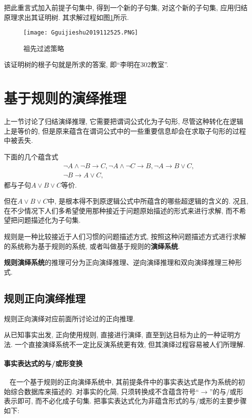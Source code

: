 把此重言式加入前提子句集中, 得到一个新的子句集, 对这个新的子句集, 应用归结原理求出其证明树. 其求解过程如图\ref{AI32fig25}所示.
\begin{figure}[H]
\centering
\texttt{[image: Gguijieshu2019112525.PNG]}
\caption{祖先过滤策略}
\label{AI32fig25}
\end{figure}
该证明树的根子句就是所求的答案, 即“李明在302教室”.
\section{基于规则的演绎推理}
上一节讨论了归结演绎推理, 它需要把谓词公式化为子句形, 尽管这种转化在逻辑上是等价的, 但是原来蕴含在谓词公式中的一些重要信息却会在求取子句形的过程中被丢失.
\begin{example}
下面的几个蕴含式
\begin{align}
  &\neg A\wedge \neg B\rightarrow C,  \neg A\wedge \neg C\rightarrow B,  \neg A\rightarrow B\vee C,\\
  &\neg B\rightarrow A\vee C,
\end{align}
都与子句$A\vee B\vee C$等价.
\end{example}

但在$A\vee B\vee C$中, 是根本得不到原逻辑公式中所蕴含的哪些超逻辑的含义的. 况且, 在不少情况下人们多希望使用那种接近于问题原始描述的形式来进行求解, 而不希望把问题描述化为子句集.

规则是一种比较接近于人们习惯的问题描述方式, 按照这种问题描述方式进行求解的系统称为基于规则的系统, 或者叫做基于规则的\textbf{演绎系统}.

\textbf{规则演绎系统}的推理可分为正向演绎推理、逆向演绎推理和双向演绎推理三种形式.
\subsection{规则正向演绎推理}
规则正向演绎对应前面所讨论过的正向推理.

从已知事实出发, 正向使用规则, 直接进行演绎, 直至到达目标为止的一种证明方法. 一个直接演绎系统不一定比反演系统更有效, 但其演绎过程容易被人们所理解.
\paragraph{事实表达式的与/或形变换}~{}
在一个基于规则的正向演绎系统中, 其前提条件中的事实表达式是作为系统的初始综合数据库来描述的. 对事实的化简, 只须转换成不含蕴含符号“$\rightarrow$”的与/或形表示即可, 而不必化成子句集.
把事实表达式化为非蕴含形式的与/或形的主要步骤如下:

